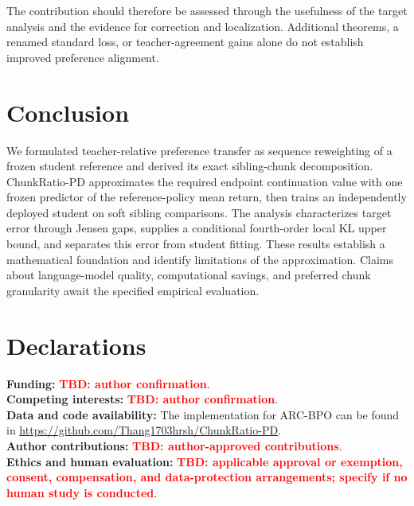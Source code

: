 \documentclass[pdflatex,sn-mathphys-num,review]{sn-jnl}
\theoremstyle{thmstyleone}
\theoremstyle{thmstyletwo}
\theoremstyle{thmstylethree}
\newcommand{\tbd}[1][]{\textcolor{red}{\textbf{TBD#1}}}
\begin{document}
The contribution should therefore be assessed through the usefulness of the target analysis and the evidence for correction and localization. Additional theorems, a renamed standard loss, or teacher-agreement gains alone do not establish improved preference alignment.

\section{Conclusion}
\label{sec:conclusion}
We formulated teacher-relative preference transfer as sequence reweighting of a frozen student reference and derived its exact sibling-chunk decomposition. ChunkRatio-PD approximates the required endpoint continuation value with one frozen predictor of the reference-policy mean return, then trains an independently deployed student on soft sibling comparisons. The analysis characterizes target error through Jensen gaps, supplies a conditional fourth-order local KL upper bound, and separates this error from student fitting. These results establish a mathematical foundation and identify limitations of the approximation. Claims about language-model quality, computational savings, and preferred chunk granularity await the specified empirical evaluation.

\section*{Declarations}
\noindent\textbf{Funding:} \tbd[: author confirmation].\\
\textbf{Competing interests:} \tbd[: author confirmation].\\
\textbf{Data and code availability:} The implementation for ARC-BPO can be found in \url{https://github.com/Thang1703hrsh/ChunkRatio-PD}. \\
\textbf{Author contributions:} \tbd[: author-approved contributions].\\
\textbf{Ethics and human evaluation:} \tbd[: applicable approval or exemption, consent, compensation, and data-protection arrangements; specify if no human study is conducted].

\end{document}
